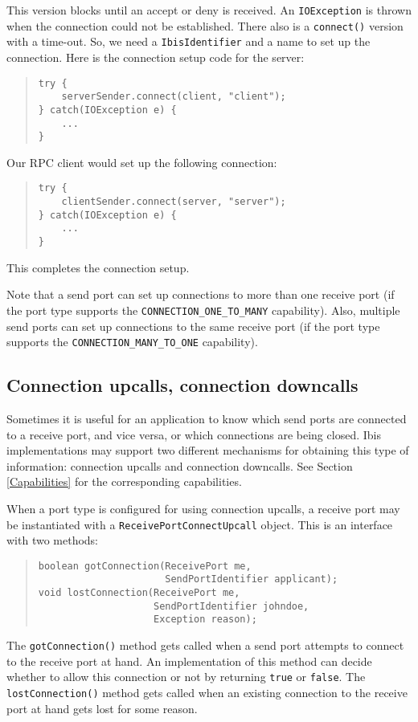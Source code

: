 \documentclass[10pt]{article}
\newcommand{\mysubsection}[1]{\subsection{#1}\label{#1}}
\begin{document}
\noindent
This version blocks until an accept or deny is received.
An \texttt{IOException} is thrown when the connection could not be established.
There also is a \texttt{connect()} version with a time-out.
So, we need a \texttt{IbisIdentifier} and a name to set up the
connection.
Here is the connection setup code for the server:

{\small
\begin{quote}
\begin{verbatim}
try {
    serverSender.connect(client, "client");
} catch(IOException e) {
    ...
}
\end{verbatim}
\end{quote}
}

\noindent
Our RPC client would set up the following connection:

{\small
\begin{quote}
\begin{verbatim}
try {
    clientSender.connect(server, "server");
} catch(IOException e) {
    ...
}
\end{verbatim}
\end{quote}
}

This completes the connection setup.

Note that a send port can set up connections to more than one
receive port (if the port type supports the \texttt{CONNECTION_ONE_TO_MANY}
capability). Also, multiple send ports can set up
connections to the same receive port (if the port type supports
the \texttt{CONNECTION_MANY_TO_ONE} capability).

\mysubsection{Connection upcalls, connection downcalls}

Sometimes it is useful for an application to know which send ports
are connected to a receive port, and vice versa, or which connections
are being closed.
Ibis implementations may support two different mechanisms for obtaining
this type of information: connection upcalls and connection downcalls.
See Section \ref{Capabilities} for the corresponding capabilities.

When a port type is configured for using connection upcalls,
a receive port may be instantiated with a \texttt{ReceivePortConnectUpcall}
object. This is an interface with two methods:

{\small
\begin{quote}
\begin{verbatim}
boolean gotConnection(ReceivePort me,
                      SendPortIdentifier applicant);
void lostConnection(ReceivePort me,
                    SendPortIdentifier johndoe,
                    Exception reason);
\end{verbatim}
\end{quote}
}
\noindent 
The \texttt{gotConnection()} method gets called when a send port attempts
to connect to the receive port at hand.
An implementation of this method can decide whether
to allow this connection or not by returning \texttt{true} or \texttt{false}.
The \texttt{lostConnection()} method gets called when an existing connection
to the receive port at hand gets lost for some reason.
\end{document}
